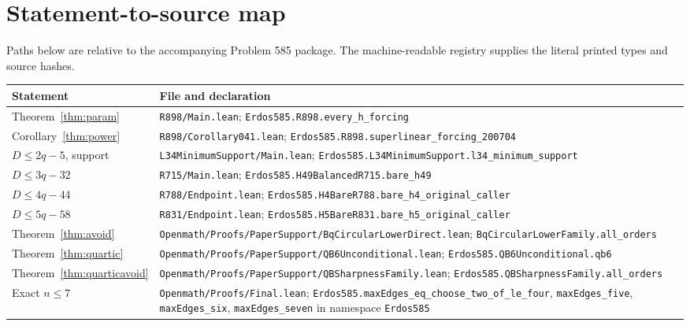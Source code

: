 \documentclass[11pt]{article}
\begin{document}
\section{Statement-to-source map}\label{sec:map}
Paths below are relative to the accompanying Problem 585 package. The machine-readable registry supplies the literal printed types and source hashes.
\begin{longtable}{@{}p{}p{}@{}}
\toprule
Statement & File and declaration\\\midrule
\endhead
Theorem~\ref{thm:param} & \nolinkurl{R898/Main.lean}; \nolinkurl{Erdos585.R898.every_h_forcing}\\[4pt]
Corollary~\ref{thm:power} & \nolinkurl{R898/Corollary041.lean}; \nolinkurl{Erdos585.R898.superlinear_forcing_200704}\\[4pt]
$D\le2q-5$, support & \nolinkurl{L34MinimumSupport/Main.lean}; \nolinkurl{Erdos585.L34MinimumSupport.l34_minimum_support}\\[4pt]
$D\le3q-32$ & \nolinkurl{R715/Main.lean}; \nolinkurl{Erdos585.H49BalancedR715.bare_h49}\\[4pt]
$D\le4q-44$ & \nolinkurl{R788/Endpoint.lean}; \nolinkurl{Erdos585.H4BareR788.bare_h4_original_caller}\\[4pt]
$D\le5q-58$ & \nolinkurl{R831/Endpoint.lean}; \nolinkurl{Erdos585.H5BareR831.bare_h5_original_caller}\\[4pt]
Theorem~\ref{thm:avoid} & \nolinkurl{Openmath/Proofs/PaperSupport/BqCircularLowerDirect.lean}; \nolinkurl{BqCircularLowerFamily.all_orders}\\[4pt]
Theorem~\ref{thm:quartic} & \nolinkurl{Openmath/Proofs/PaperSupport/QB6Unconditional.lean}; \nolinkurl{Erdos585.QB6Unconditional.qb6}\\[4pt]
Theorem~\ref{thm:quarticavoid} & \nolinkurl{Openmath/Proofs/PaperSupport/QBSharpnessFamily.lean}; \nolinkurl{Erdos585.QBSharpnessFamily.all_orders}\\[4pt]
Exact $n\le7$ & \nolinkurl{Openmath/Proofs/Final.lean}; \nolinkurl{Erdos585.maxEdges_eq_choose_two_of_le_four}, \nolinkurl{maxEdges_five}, \nolinkurl{maxEdges_six}, \nolinkurl{maxEdges_seven} in namespace \nolinkurl{Erdos585}\\
\bottomrule
\end{longtable}
\end{document}
